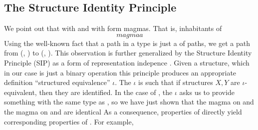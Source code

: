 \subsection{The Structure Identity Principle}
We point out that \bN{} with  and \bL{} with  form magmas. That is, inhabitants of
\[ magmaa \]
Using the well-known fact that a path in a  type is just a  of paths, we get a path from (\bN{}, ) to (\bL{}, ). %
This observation is further generalized by the Structure Identity Principle (SIP) as a form of representation indepence \cite{iri}. Given a structure, which in our case is just a binary operation
this principle produces an appropriate definition ``structured equivalence'' $\iota$. The $\iota$ is such that if structures $X, Y$ are $\iota$-equivalent, then they are identified. In the case of , the $\iota$ asks us to provide something with the same type as , so we have just shown that the  magma on \bL{}
and the \AgdaFunction{\_+\_} magma on \bN{} and are identical
As a consequence, properties of \AgdaFunction{\_+\_} directly yield corresponding properties of . For example,
